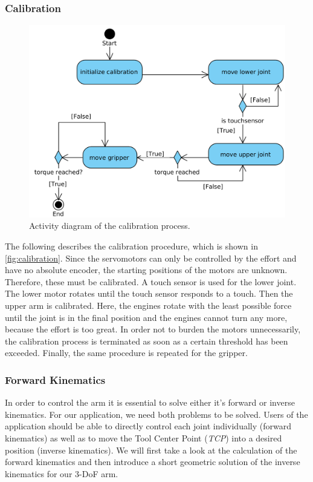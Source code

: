 \documentclass[conference]{IEEEtran}
\begin{document}
\subsubsection{Calibration}\label{sec:calibration}
\begin{figure}[htbp] 
	\centering
	\includegraphics[width=\textwidth/2]{img/calibration.png}
	\caption[caption]{Activity diagram of the calibration process.}
\label{fig:calibration}
\end{figure}
The following describes the calibration procedure, which is shown in \autoref{fig:calibration}. Since the servomotors can only be controlled by the effort and have no absolute encoder, the starting positions of the motors are unknown. Therefore, these must be calibrated. A touch sensor is used for the lower joint. The lower motor rotates until the touch sensor responds to a touch. Then the upper arm is calibrated. Here, the engines rotate with the least possible force until the joint is in the final position and the engines cannot turn any more, because the effort is too great. In order not to burden the motors unnecessarily, the calibration process is terminated as soon as a certain threshold has been exceeded. Finally, the same procedure is repeated for the gripper.

\subsubsection{Forward Kinematics}\label{sec:forwardkinematics}
In order to control the arm it is essential to solve either it's forward or inverse kinematics. For our application, we need both problems to be solved. Users of the application should be able to directly control each joint individually (forward kinematics) as well as to move the Tool Center Point (\textit{TCP}) into a desired position (inverse kinematics). We will first take a look at the calculation of the forward kinematics and then introduce a short geometric solution of the inverse kinematics for our 3-DoF arm.
\end{document}
